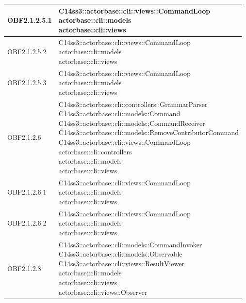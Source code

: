 \documentclass{scalatekids-article}
\begin{document}
\begin{longtable}[H]{|p{4.5cm}|p{13cm}|}
\hline
OBF2.1.2.5.1 & \multiLineCell[t]{C14ss3::actorbase::cli::views::CommandLoop\\actorbase::cli::models\\actorbase::cli::views\\}\\
\hline
OBF2.1.2.5.2 & \multiLineCell[t]{C14ss3::actorbase::cli::views::CommandLoop\\actorbase::cli::models\\actorbase::cli::views\\}\\
\hline
OBF2.1.2.5.3 & \multiLineCell[t]{C14ss3::actorbase::cli::views::CommandLoop\\actorbase::cli::models\\actorbase::cli::views\\}\\
\hline
OBF2.1.2.6 & \multiLineCell[t]{C14ss3::actorbase::cli::controllers::GrammarParser\\C14ss3::actorbase::cli::models::Command\\C14ss3::actorbase::cli::models::CommandReceiver\\C14ss3::actorbase::cli::models::RemoveContributorCommand\\C14ss3::actorbase::cli::views::CommandLoop\\actorbase::cli::controllers\\actorbase::cli::models\\actorbase::cli::views\\}\\
\hline
OBF2.1.2.6.1 & \multiLineCell[t]{C14ss3::actorbase::cli::views::CommandLoop\\actorbase::cli::models\\actorbase::cli::views\\}\\
\hline
OBF2.1.2.6.2 & \multiLineCell[t]{C14ss3::actorbase::cli::views::CommandLoop\\actorbase::cli::models\\actorbase::cli::views\\}\\
\hline
OBF2.1.2.8 & \multiLineCell[t]{C14ss3::actorbase::cli::models::CommandInvoker\\C14ss3::actorbase::cli::models::Observable\\C14ss3::actorbase::cli::views::ResultViewer\\actorbase::cli::models\\actorbase::cli::views\\actorbase::cli::views::Observer\\}\\

\end{longtable}
\end{document}
